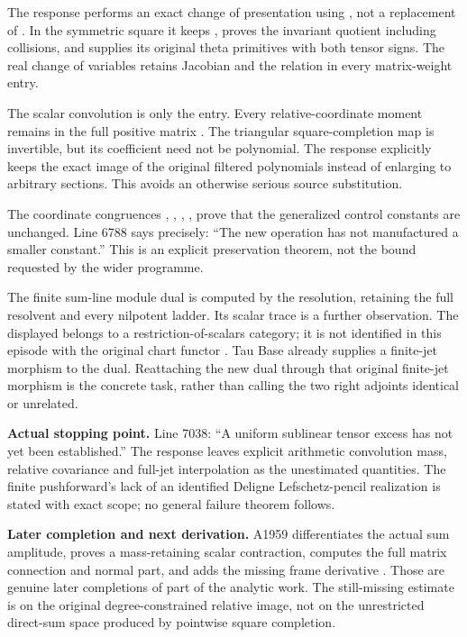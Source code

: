 The response performs an exact change of presentation using
\protect{}, not a replacement of \protect{}. In the
symmetric square it keeps \protect{}, proves the
invariant quotient \protect{} including collisions,
and supplies its original theta primitives with both tensor signs. The
real change of variables retains Jacobian \protect{} and the
relation \protect{} in every matrix-weight entry.

The scalar convolution is only the \protect{} entry. Every
relative-coordinate moment remains in the full positive matrix
\protect{}. The triangular square-completion map is
invertible, but its coefficient \protect{} need not be
polynomial. The response explicitly keeps the exact image of the
original filtered polynomials instead of enlarging to arbitrary
sections. This avoids an otherwise serious source substitution.

The coordinate congruences \protect{},
\protect{}, \protect{},
\protect{}, \protect{} prove that the generalized
control constants are unchanged. Line 6788 says precisely: ``The new
operation has not manufactured a smaller constant.'' This is an explicit
preservation theorem, not the bound requested by the wider programme.

The finite sum-line module dual is computed by the \protect{}
resolution, retaining the full resolvent and every nilpotent ladder. Its
scalar trace is a further observation. The displayed
\protect{} belongs to a restriction-of-scalars
category; it is not identified in this episode with the original chart
functor \protect{}. Tau Base already supplies a finite-jet
morphism to the \protect{} dual. Reattaching the new dual
through that original finite-jet morphism is the concrete task, rather
than calling the two right adjoints identical or unrelated.

\textbf{Actual stopping point.} Line 7038: ``A uniform sublinear tensor
excess has not yet been established.'' The response leaves explicit
arithmetic convolution mass, relative covariance and full-jet
interpolation as the unestimated quantities. The finite pushforward's
lack of an identified Deligne Lefschetz-pencil realization is stated
with exact scope; no general failure theorem follows.

\textbf{Later completion and next derivation.} A1959 differentiates the
actual sum amplitude, proves a mass-retaining scalar contraction,
computes the full matrix connection and normal part, and adds the
missing frame derivative \protect{}. Those are genuine
later completions of part of the analytic work. The still-missing
estimate is on the original degree-constrained relative image, not on
the unrestricted direct-sum space produced by pointwise square
completion.


